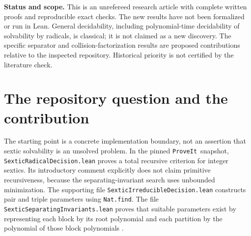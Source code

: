 \documentclass[11pt,letterpaper]{article}
\numberwithin{equation}{section}
\theoremstyle{definition}
\theoremstyle{remark}
\newcommand{\repo}{\texttt{ProveIt}}
\newcommand{\src}[1]{\texttt{\nolinkurl{#1}}}
\begin{document}
\begin{titlepage}
\begin{abstract}
\[\]
For the generic sextic, the three factors are irreducible and have the stated
exact degrees. Consequently 196 is optimal for a guarantee valid for every
set of distinct nonzero complex test parameters, although optimality of the
initial integer interval is not established. A split integer example gives a
lower bound of eight for that latter problem. We derive a coefficient-only
primitive-recursive decision architecture, a height-only separator requiring
no search, a precise repository integration plan, and further research
questions. Exact symbolic checks and a modular B\'ezout certificate accompany
the proofs.
\end{abstract}
\vfill
\begin{resultbox}
\textbf{Status and scope.} This is an unrefereed research article with complete
written proofs and reproducible exact checks. The new results have not been
formalized or run in Lean. General decidability, including polynomial-time
decidability of solvability by radicals, is classical; it is not claimed as a
new discovery. The specific separator and collision-factorization results are
proposed contributions relative to the inspected repository. Historical
priority is not certified by the literature check.
\end{resultbox}
\end{titlepage}
\hypersetup{pageanchor=true}
\tableofcontents
\clearpage

\section{The repository question and the contribution}
\label{sbr:sec:scope}

The starting point is a concrete implementation boundary, not an assertion
that sextic solvability is an unsolved problem. In the pinned \repo\ snapshot,
\src{SexticRadicalDecision.lean} proves a total recursive criterion for integer
sextics. Its introductory comment explicitly does not claim primitive
recursiveness, because the separating-invariant search uses unbounded
minimization. The supporting file \src{SexticIrreducibleDecision.lean}
constructs pair and triple parameters using \src{Nat.find}. The file
\src{SexticSeparatingInvariants.lean} proves that suitable parameters exist by
representing each block by its root polynomial and each partition by the
polynomial of those block polynomials \cite{repo,repo-decision,repo-search,repo-invariants}.
\end{document}
